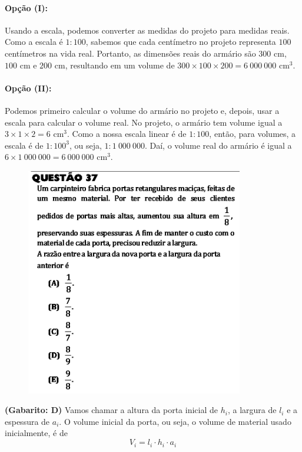 \documentclass[a4paper]{article}
\begin{document}
\paragraph{Opção (I):} Usando a escala, podemos converter as medidas do projeto para medidas reais. Como a escala é $1:100$, sabemos que cada centímetro no projeto representa $100$ centímetros na vida real. Portanto, as dimensões reais do armário são $300$ cm, $100$ cm e $200$ cm, resultando em um volume de $300\times 100\times 200 = 6\ 000\ 000$ cm$^3$.
\paragraph{Opção (II):} Podemos primeiro calcular o volume do armário no projeto e, depois, usar a escala para calcular o volume real. No projeto, o armário tem volume igual a $3\times 1 \times 2 = 6$ cm$^3$. Como a nossa escala linear é de $1:100$, então, para volumes, a escala é de $1: 100^3$, ou seja, $1:1\ 000\ 000$. Daí, o volume real do armário é igual a $6\times 1\ 000\ 000 = 6\ 000\ 000$ cm$^3$.
\begin{figure}[H]
	\begin{center}
		\includegraphics[width=9.5cm]{L2Q37.png}
	\end{center}
\end{figure}
\par\textbf{(Gabarito: D)} Vamos chamar a altura da porta inicial de $h_i$, a largura de $l_i$ e a espessura de $a_i$. O volume inicial da porta, ou seja, o volume de material usado inicialmente, é de
\begin{equation*}
V_i = l_i\cdot h_i\cdot a_i
\end{equation*} 
\end{document}
